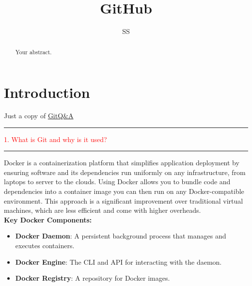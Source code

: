 \documentclass{article}
\title{GitHub}
\author{SS}
\begin{document}
\maketitle

\begin{abstract}
Your abstract.
\end{abstract}

\section{Introduction}

Just a copy of \href{https://github.com/Devinterview-io/git-interview-questions}{GitQ\&A} \\

\noindent
{\color{red} \rule{\linewidth}{0.5mm}}
\textcolor{red}{1. What is Git and why is it used?} \\
\noindent
{\color{red} \rule{\linewidth}{0.5mm}}


\textcolor{PineGreen}{Docker is a containerization platform that simplifies application deployment by ensuring software and its dependencies run uniformly on any infrastructure, from laptops to server to the clouds.}
\textcolor{PineGreen}{Using Docker allows you to bundle code and dependencies into a container image you can then run on any Docker-compatible environment. This approach is a significant improvement over traditional virtual machines, which are less efficient and come with higher overheads.}\\
\textbf{Key Docker Components:} 
\begin{itemize}
\color{blue}
\item \textbf{Docker Daemon}: A persistent background process that manages and executes containers.
\item \textbf{Docker Engine}: The CLI and API for interacting with the daemon.
\item \textbf{Docker Registry}: A repository for Docker images.
\end{itemize}
\end{document}
